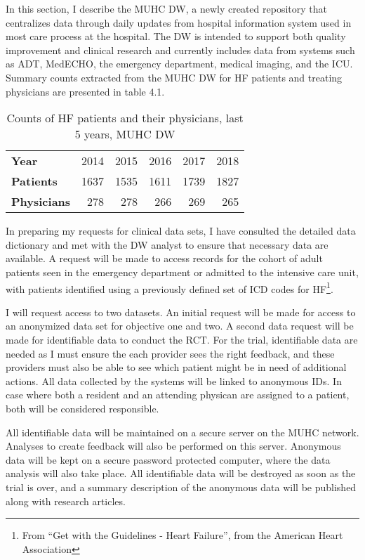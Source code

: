 In this section, I describe the MUHC \gls{DW}, a newly created repository that centralizes data through daily updates from hospital information system used in most care process at the hospital. The \gls{DW} is intended to support both quality improvement and clinical research and currently includes data from systems such as ADT, MedECHO, the emergency department, medical imaging, and the ICU. Summary counts extracted from the MUHC DW for HF patients and treating physicians are presented in table 4.1.

\begin{table}[h!]
\centering
\begin{tabular}{l|rrrrr}
\textbf{Year}       & 2014 & 2015 & 2016 & 2017 & 2018   \\
\textbf{Patients}   & 1637 & 1535 & 1611 & 1739 & 1827 \\
\textbf{Physicians} & 278 & 278 & 266 & 269 & 265 
\end{tabular}
\caption{Counts of HF patients and their physicians, last 5 years, MUHC DW}
\end{table}

In preparing my requests for clinical data sets, I have consulted the detailed data dictionary and met with the DW analyst to ensure that necessary data are available. A request will be made to access records for the cohort of adult patients seen in the emergency department or admitted to the intensive care unit, with patients identified using a previously defined set of ICD codes for HF\footnote{From ``Get with the Guidelines - Heart Failure'', from the American Heart Association}.

I will request access to two datasets. An initial request will be made for access to an anonymized data set for objective one and two. A second data request will be made for identifiable data to conduct the RCT. For the trial, identifiable data are needed as I must ensure the each provider sees the right feedback, and these providers must also be able to see which patient might be in need of additional actions. All data collected by the systems will be linked to anonymous IDs. In case where both a resident and an attending physican are assigned to a patient, both will be considered responsible.

All identifiable data will be maintained on a secure server on the MUHC network. Analyses to create feedback will also be performed on this server. Anonymous data will be kept on a secure password protected computer, where the data analysis will also take place. All identifiable data will be destroyed as soon as the trial is over, and a summary description of the anonymous data will be published along with research articles.

